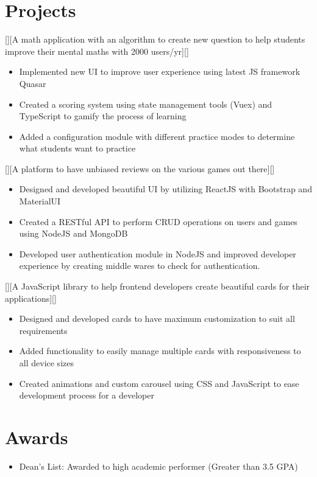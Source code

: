\documentclass{article}
\begin{document}
 
 
\section{Projects}
[][A math application with an algorithm to create new question to help students improve their mental maths with 2000 users/yr][]

 \begin{itemize}
    \item Implemented new UI to improve user experience using latest JS framework Quasar
    \item Created a scoring system using state management tools (Vuex) and TypeScript to gamify the process of learning
    \item Added a configuration module with different practice modes to determine what students want to practice
 \end{itemize}
 
 [][A platform to have unbiased reviews on the various games out there][]

 \begin{itemize}
    \item Designed and developed beautiful UI by utilizing ReactJS with Bootstrap and MaterialUI
    \item Created a RESTful API to perform CRUD operations on users and games using NodeJS and MongoDB
    \item Developed user authentication module in NodeJS and improved developer experience by creating middle wares to check for authentication.
 \end{itemize}
 
 [][A JavaScript library to help frontend developers create beautiful cards for their applications][]

 \begin{itemize}
    \item Designed and developed cards to have maximum customization to suit all requirements
    \item Added functionality to easily manage multiple cards with responsiveness to all device sizes
    \item Created animations and custom carousel using CSS and JavaScript to ease development process for a developer
 \end{itemize}



\section{Awards}
\begin{itemize}
\item Dean's List: Awarded to high academic performer (Greater than 3.5 GPA)
\end{itemize}
\end{document}
